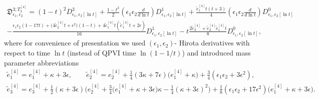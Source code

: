 \documentclass[12pt,a4paper]{article}
\numberwithin{equation}{section}
\begin{document}
\vspace{-0.7cm}

\begin{multline}\label{Okamoto_op_VI_3}
\mathfrak{D}^{3;T_3^{[4]}}_{\epsilon_1,\epsilon_2}=(1{-}t)^2D^3_{\epsilon_1,\epsilon_2[\ln t]}+\frac{1{-}t^2}2\left(\epsilon_1\epsilon_2\frac{d}{d\ln t}\right)D^1_{\epsilon_1,\epsilon_2[\ln t]}+\frac{\tilde{e}_1^{[4]}t(t{+}3)}4\left(\epsilon_1\epsilon_2\frac{d}{d\ln t}\right)D^0_{\epsilon_1,\epsilon_2[\ln t]}\\
-\frac{\epsilon_1\epsilon_2(1{-}17t)+\big(4\tilde{e}_2^{[4]} t{+}\epsilon^2\big)(1{-}t)+4\tilde{e}_1^{[4]}t(\tilde{e}_1^{[4]}t{+}2\epsilon)}{16}D^1_{\epsilon_1,\epsilon_2[\ln t]}
-t\frac{2\tilde{e}_3^{[4]}+\tilde{e}_2^{[4]}\tilde{e}_1^{[4]}t}8 D^0_{\epsilon_1,\epsilon_2[\ln t]},
\end{multline}
where for convenience of presentation we used $(\epsilon_1,\epsilon_2)$- Hirota derivatives with respect to time $\ln t$ (instead of QPVI time $\ln (1{-}1/t)$) and introduced mass parameter abbreviations
\begin{multline}
\tilde{e}_1^{[4]}=e_1^{[4]}+\kappa+3\epsilon, \qquad \tilde{e}_2^{[4]}=e_2^{[4]}+\frac14(3\kappa{+}7\epsilon)\big(e_1^{[4]}{+}\kappa\big)+\frac34(\epsilon_1\epsilon_2{+}3\epsilon^2), \\   \tilde{e}_3^{[4]}=e_3^{[4]}+\frac12(\kappa{+}3\epsilon)\Big(e_2^{[4]}+\frac34\big(e_1^{[4]}{+}\kappa{+}3\epsilon\big)\kappa-\frac14(\kappa{+}3\epsilon)^2\Big)+\frac18(\epsilon_1\epsilon_2{+}17\epsilon^2)\big(e_1^{[4]}{+}\kappa{+}3\epsilon\big).
\end{multline}
\end{document}
